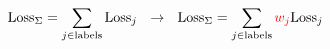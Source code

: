 \begin{equation*}
	\text{Loss}_\Sigma = \sum_{j \in \text{labels}} \text{Loss}_j 
	\ \ \to \ \ 
	\text{Loss}_\Sigma = \sum_{j \in \text{labels}} \red{w_j} \text{Loss}_j
\end{equation*}